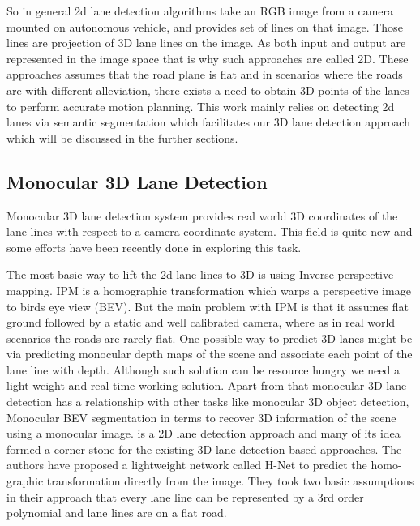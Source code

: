 So in general 2d lane detection algorithms take an RGB image from a camera mounted on autonomous vehicle, and provides set of lines on that image. Those lines are projection of 3D lane lines on the image. As both input and output are represented in the image space that is why such approaches are called 2D. These approaches assumes that the road plane is flat and in scenarios where the roads are with different alleviation, there exists a need to obtain 3D points of the lanes to perform accurate motion planning. This work mainly relies on detecting 2d lanes via semantic segmentation which facilitates our 3D lane detection approach which will be discussed in the further sections. 
        
        \subsection{Monocular 3D Lane Detection}
        Monocular 3D lane detection system provides real world 3D coordinates of the lane lines with respect to a camera coordinate system. This field is quite new and some efforts have been recently done in exploring this task. 
 
The most basic way to lift the 2d lane lines to 3D is using Inverse perspective mapping. IPM is a homographic transformation which warps a perspective image to birds eye view (BEV). But the main problem with IPM is that it assumes flat ground followed by a static and well calibrated camera, where as in real world scenarios the roads are rarely flat. One possible way to predict 3D lanes might be via predicting monocular depth maps of the scene and associate each point of the lane line with depth. Although such solution can be resource hungry we need a light weight and real-time working solution. Apart from that monocular 3D lane detection has a relationship with other tasks like monocular 3D object detection, Monocular BEV segmentation in terms to recover 3D information of the scene using a monocular image.
\cite{DBLP:journals/corr/abs-1802-05591} is a 2D lane detection approach and many of its idea formed a corner stone for the existing 3D lane detection based approaches. The authors have proposed a lightweight network called H-Net to predict the homo-graphic transformation directly from the image. They took two basic assumptions in their approach that every lane line can be represented by a 3rd order polynomial and lane lines are on a flat road. 

